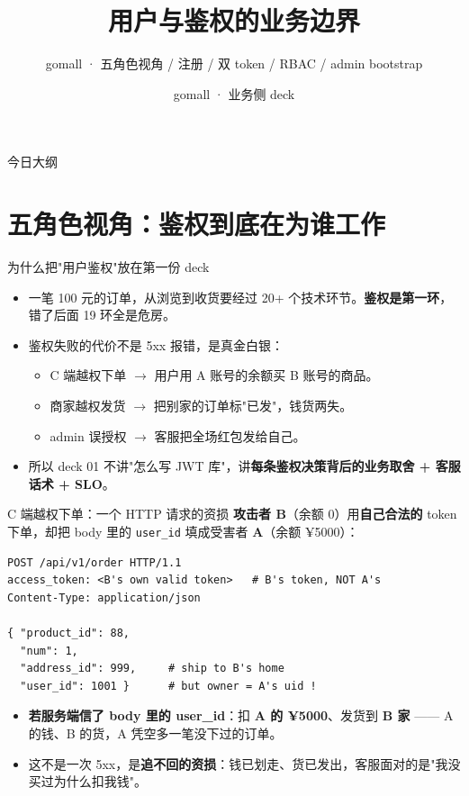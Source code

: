 \documentclass[aspectratio=169,11pt]{beamer}
\title{用户与鉴权的业务边界}
\subtitle{gomall · 五角色视角 / 注册 / 双 token / RBAC / admin bootstrap}
\author{gomall · 业务侧 deck}
\date{}
\begin{document}
\maketitle

\begin{frame}[shrink]{今日大纲}
\tableofcontents
\end{frame}

\section{五角色视角：鉴权到底在为谁工作}

\begin{frame}[shrink]{为什么把"用户鉴权"放在第一份 deck}
\begin{itemize}
  \item 一笔 100 元的订单，从浏览到收货要经过 20+ 个技术环节。\textbf{鉴权是第一环}，错了后面 19 环全是危房。
  \item 鉴权失败的代价不是 5xx 报错，是真金白银：
  \begin{itemize}
    \item C 端越权下单 \(\to\) 用户用 A 账号的余额买 B 账号的商品。
    \item 商家越权发货 \(\to\) 把别家的订单标"已发"，钱货两失。
    \item admin 误授权 \(\to\) 客服把全场红包发给自己。
  \end{itemize}
  \item 所以 deck 01 不讲"怎么写 JWT 库"，讲\textbf{每条鉴权决策背后的业务取舍 + 客服话术 + SLO}。
\end{itemize}
\end{frame}

\begin{frame}{C 端越权下单：一个 HTTP 请求的资损}
\textbf{攻击者 B}（余额 0）用\textbf{自己合法的} token 下单，却把 body 里的 \texttt{user\_id} 填成受害者 \textbf{A}（余额 ¥5000）：
\begin{lstlisting}[basicstyle=\scriptsize\ttfamily]
POST /api/v1/order HTTP/1.1
access_token: <B's own valid token>   # B's token, NOT A's
Content-Type: application/json

{ "product_id": 88,
  "num": 1,
  "address_id": 999,     # ship to B's home
  "user_id": 1001 }      # but owner = A's uid !
\end{lstlisting}
\begin{itemize}\scriptsize
  \item \textbf{若服务端信了 body 里的 user\_id}：扣 \textbf{A 的 ¥5000}、发货到 \textbf{B 家} —— A 的钱、B 的货，A 凭空多一笔没下过的订单。
  \item 这不是一次 5xx，是\textbf{追不回的资损}：钱已划走、货已发出，客服面对的是"我没买过为什么扣我钱"。
\end{itemize}
\end{frame}
\end{document}
